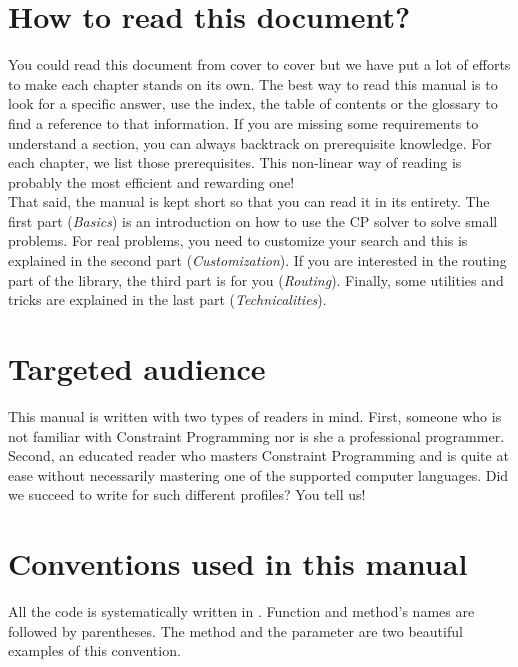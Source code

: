 \begin{titlepage}
\section*{How to read this document?}

You could read this document from cover to cover but we have put a lot of efforts to make each chapter stands on its own.
The best way to read this manual is to look for a specific answer, use the index, the table of contents or the glossary to find a reference to that information.
If you are missing some requirements to understand a section, you can always backtrack on prerequisite knowledge. For each chapter, we list those prerequisites. This
non-linear way of reading is probably the most efficient and rewarding one!\\

That said, the manual is kept short so that you can read it in its entirety. The first part (\emph{Basics}) is an introduction on how to use the CP solver
to solve small problems. For real problems, you need to customize your search and this is explained in the second part (\emph{Customization}). If you are interested
in the routing part of the library, the third part is for you (\emph{Routing}). Finally, some utilities and tricks are explained in the last part (\emph{Technicalities}).

\section*{Targeted audience}

This manual is written with two types of readers in mind. First, someone who is not familiar with Constraint Programming
    nor is she a professional programmer. Second, an educated reader who masters Constraint Programming and is quite at ease without
    necessarily mastering one of the supported computer languages. Did we succeed to write for such different profiles? You tell  
    us! 
    
\section*{Conventions used in this manual}

All the code is systematically written in . Function and method's names are followed by parentheses. The method  and
the parameter  are two beautiful examples of this convention.\\


\end{titlepage}
